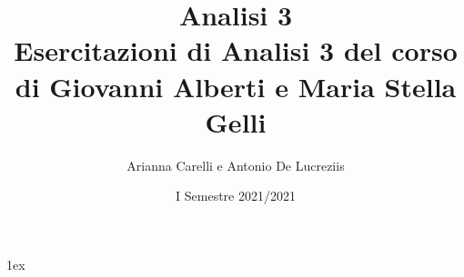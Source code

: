 \documentclass[a4paper, 12pt]{article}
\title{{\Huge Analisi 3}\\{\small Esercitazioni di Analisi 3 del corso di Giovanni Alberti e Maria Stella Gelli}}
\author{Arianna Carelli e Antonio De Lucreziis}
\date{I Semestre 2021/2021}
\begin{document}
%
%
\parskip 1ex
\setlength{\parindent}{0pt}

\maketitle





















\end{document}
